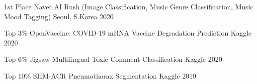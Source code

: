 


\begin{cvhonors}
  \cvhonor
  {1st Place} %
  {Naver AI Rush (Image Classification, Music Genre Classification, Music Mood Tagging)} %
  {Seoul, S.Korea} %
  {2020} %

\end{cvhonors}


\begin{cvhonors}

  \cvhonor
  {Top 3\%} %
  {OpenVaccine: COVID-19 mRNA Vaccine Degradation Prediction} %
  {Kaggle} %
  {2020} %

  \cvhonor
  {Top 6\%} %
  {Jigsaw Multilingual Toxic Comment Classification} %
  {Kaggle} %
  {2020} %


  \cvhonor
  {Top 10\%} %
  {SIIM-ACR Pneumothorax Segmentation} %
  {Kaggle} %
  {2019} %

\end{cvhonors}